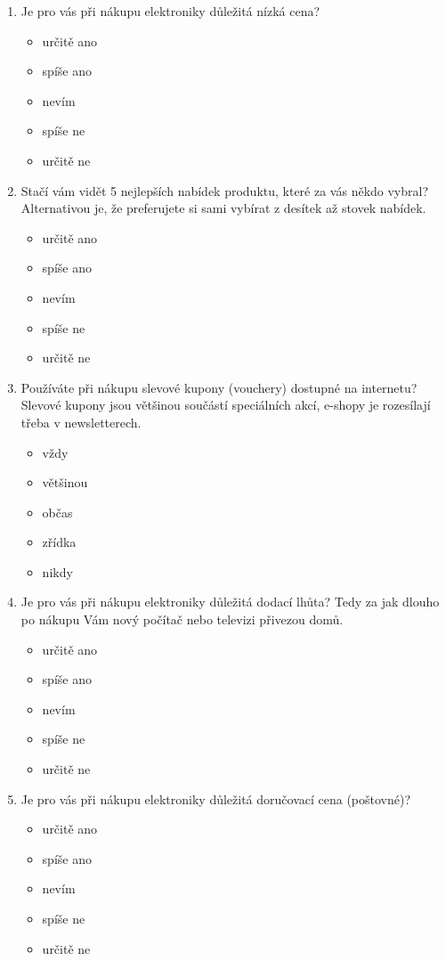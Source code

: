 \documentclass[12pt,oneside,openany]{fithesis}
\begin{document}
\begin{enumerate}
  \item Je pro vás při nákupu elektroniky důležitá nízká cena? 
    \begin{itemize}
       \item určitě ano
       \item spíše ano
       \item nevím
       \item spíše ne
       \item určitě ne
    \end{itemize}

  \item Stačí vám vidět 5 nejlepších nabídek produktu, které za vás někdo vybral?
      Alternativou je, že preferujete si sami vybírat z desítek až stovek nabídek.
    \begin{itemize}
       \item určitě ano
       \item spíše ano
       \item nevím
       \item spíše ne
       \item určitě ne
    \end{itemize}

\item Používáte při nákupu slevové kupony (vouchery) dostupné na internetu?
    Slevové kupony jsou většinou součástí speciálních akcí, e-shopy je rozesílají třeba v newsletterech. 
    \begin{itemize}
       \item vždy
       \item většinou
       \item občas
       \item zřídka
       \item nikdy
    \end{itemize}

  \item Je pro vás při nákupu elektroniky důležitá dodací lhůta?
      Tedy za jak dlouho po nákupu Vám nový počítač nebo televizi přivezou domů.
    \begin{itemize}
       \item určitě ano
       \item spíše ano
       \item nevím
       \item spíše ne
       \item určitě ne
    \end{itemize}

\item Je pro vás při nákupu elektroniky důležitá doručovací cena (poštovné)?
    \begin{itemize}
       \item určitě ano
       \item spíše ano
       \item nevím
       \item spíše ne
       \item určitě ne
    \end{itemize}


\end{enumerate}
\end{document}
